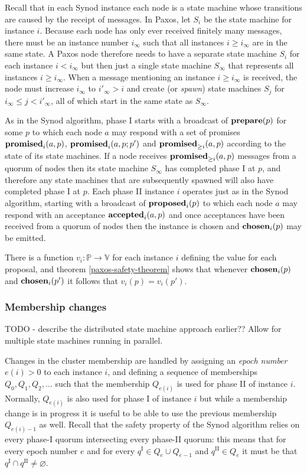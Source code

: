 \documentclass[journal]{IEEEtran}
\begin{document}
Recall that in each Synod instance each node is a state machine whose
transitions are caused by the receipt of messages. In Paxos, let $S_i$ be the
state machine for instance $i$. Because each node has only ever received
finitely many messages, there must be an instance number $i_\infty$ such that
all instances $i \ge i_\infty$ are in the same state. A Paxos node therefore
needs to have a separate state machine $S_i$ for each instance $i < i_\infty$
but then just a single state machine $S_\infty$ that represents all instances
$i \ge i_\infty$. When a message mentioning an instance $i \ge i_\infty$ is
received, the node must increase $i_\infty$ to $i'_\infty > i$ and create (or
\textit{spawn}) state machines $S_j$ for $i_\infty \le j < i'_\infty$, all of
which start in the same state as $S_\infty$.

As in the Synod algorithm, phase I starts with a broadcast of $\mathbf{prepare}(p)$ for
some $p$ to which each node $a$ may respond with a set of promises
$\mathbf{promised}_{i}(a,p)$, $\mathbf{promised}_{i}(a,p;p')$ and $\mathbf{promised}_{\ge i}(a,p)$ according to the
state of its state machines. If a node receives $\mathbf{promised}_{\ge i}(a,p)$ messages from
a quorum of nodes then its state machine $S_\infty$ has completed phase I at
$p$, and therefore any state machines that are subsequently spawned will also
have completed phase I at $p$. Each phase II instance $i$ operates just as in
the Synod algorithm, starting with a broadcast of $\mathbf{proposed}_{i}(p)$ to which each
node $a$ may respond with an acceptance $\mathbf{accepted}_{i}(a,p)$ and once acceptances
have been received from a quorum of nodes then the instance is chosen and
$\mathbf{chosen}_{i}(p)$ may be emitted.

There is a function $v_i : \mathbb P \to \mathbb V$ for each instance $i$
defining the value for each proposal, and theorem \ref{paxos-safety-theorem}
shows that whenever $\mathbf{chosen}_{i}(p)$ and $\mathbf{chosen}_{i}(p')$ it follows that
$v_i(p) = v_i(p')$.

\subsubsection{Membership changes}

TODO - describe the distributed state machine approach earlier?? Allow for
multiple state machines running in parallel.

Changes in the cluster membership are handled by assigning an \textit{epoch
number} $e(i) > 0$ to each instance $i$, and defining a sequence of memberships
$Q_0, Q_1, Q_2, \ldots$ such that the membership $Q_{e(i)}$ is used for phase
II of instance $i$. Normally, $Q_{e(i)}$ is also used for phase I of instance
$i$ but while a membership change is in progress it is useful to be able to use
the previous membership $Q_{e(i)-1}$ as well. Recall that the safety property
of the Synod algorithm relies on every phase-I quorum intersecting every
phase-II quorum: this means that for every epoch number $e$ and for every
$q^\textrm{I} \in Q_{e} \cup Q_{e-1}$ and $q^\textrm{II} \in Q_{e}$ it must be
that $q^\textrm{I} \cap q^\textrm{II} \ne \varnothing$.
\end{document}

